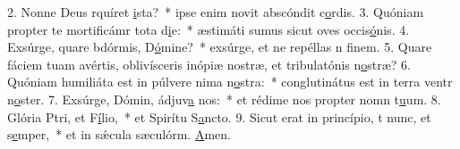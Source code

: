 2. Nonne Deus rquíret \uline{i}sta?~* ipse enim novit abscóndit c\uline{o}rdis.
3. Quóniam propter te mortificámr tota d\uline{i}e:~* æstimáti sumus sicut oves occis\uline{ó}nis.
4. Exsúrge, quare bdórmis, D\uline{ó}mine?~* exsúrge, et ne repéllas n f\uline{i}nem.
5. Quare fáciem tuam avértis, oblivísceris inópiæ nostræ, et tribulatónis n\uline{o}stræ?
6. Quóniam humiliáta est in púlvere nima n\uline{o}stra:~* conglutinátus est in terra ventr n\uline{o}ster.
7. Exsúrge, Dómin, ádjuv\uline{a} nos:~* et rédime nos propter nomn t\uline{u}um.
8. Glória Ptri, et F\uline{í}lio,~* et Spirítu S\uline{a}ncto.
9. Sicut erat in princípio, t nunc, et s\uline{e}mper,~* et in sǽcula sæculórm. \uline{A}men.

